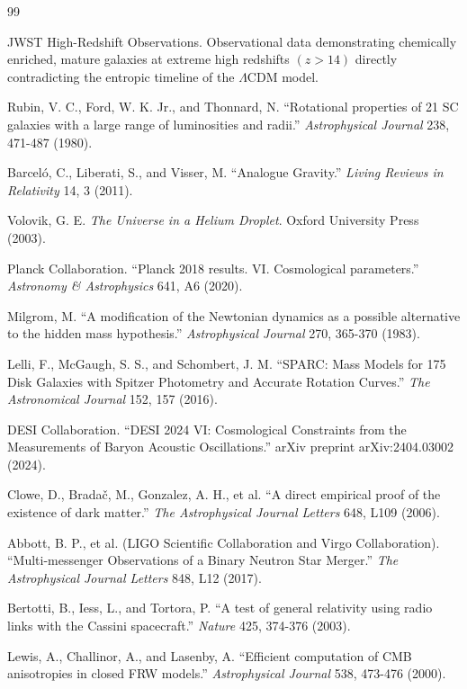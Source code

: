 \documentclass[aps,prd,onecolumn,linenumbers,superscriptaddress,nofootinbib]{revtex4-2}
\begin{document}
\begin{thebibliography}{99}

 JWST High-Redshift Observations. Observational data demonstrating chemically enriched, mature galaxies at extreme high redshifts $(z > 14)$ directly contradicting the entropic timeline of the $\Lambda$CDM model.

 Rubin, V. C., Ford, W. K. Jr., and Thonnard, N. ``Rotational properties of 21 SC galaxies with a large range of luminosities and radii.'' \textit{Astrophysical Journal} 238, 471-487 (1980).

 Barceló, C., Liberati, S., and Visser, M. ``Analogue Gravity.'' \textit{Living Reviews in Relativity} 14, 3 (2011).

 Volovik, G. E. \textit{The Universe in a Helium Droplet}. Oxford University Press (2003).

 Planck Collaboration. ``Planck 2018 results. VI. Cosmological parameters.'' \textit{Astronomy \& Astrophysics} 641, A6 (2020).

 Milgrom, M. ``A modification of the Newtonian dynamics as a possible alternative to the hidden mass hypothesis.'' \textit{Astrophysical Journal} 270, 365-370 (1983).

 Lelli, F., McGaugh, S. S., and Schombert, J. M. ``SPARC: Mass Models for 175 Disk Galaxies with Spitzer Photometry and Accurate Rotation Curves.'' \textit{The Astronomical Journal} 152, 157 (2016).

 DESI Collaboration. ``DESI 2024 VI: Cosmological Constraints from the Measurements of Baryon Acoustic Oscillations.'' arXiv preprint arXiv:2404.03002 (2024).

 Clowe, D., Bradač, M., Gonzalez, A. H., et al. ``A direct empirical proof of the existence of dark matter.'' \textit{The Astrophysical Journal Letters} 648, L109 (2006).

 Abbott, B. P., et al. (LIGO Scientific Collaboration and Virgo Collaboration). ``Multi-messenger Observations of a Binary Neutron Star Merger.'' \textit{The Astrophysical Journal Letters} 848, L12 (2017).

 Bertotti, B., Iess, L., and Tortora, P. ``A test of general relativity using radio links with the Cassini spacecraft.'' \textit{Nature} 425, 374-376 (2003).

 Lewis, A., Challinor, A., and Lasenby, A. ``Efficient computation of CMB anisotropies in closed FRW models.'' \textit{Astrophysical Journal} 538, 473-476 (2000).

\end{thebibliography}
\end{document}
